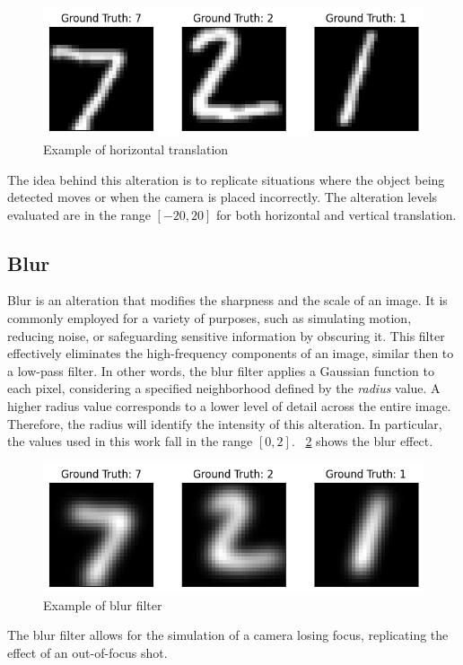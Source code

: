 \begin{figure}[h]
	\centering
	\includegraphics[width=0.6\linewidth]{ImageFiles/Alterations/HT}
	\caption{Example of horizontal translation}
	\label{fig:HT}
\end{figure}

The idea behind this alteration is to replicate situations where the object being detected moves or when the camera is placed incorrectly. The alteration levels evaluated are in the range $[-20,20]$ for both horizontal and vertical translation.

\subsection{Blur}

Blur is an alteration that modifies the sharpness and the scale of an image. It is commonly employed for a variety of purposes, such as simulating motion, reducing noise, or safeguarding sensitive information by obscuring it. This filter effectively eliminates the high-frequency components of an image, similar then to a low-pass filter. In other words, the blur filter applies a Gaussian function to each pixel, considering a specified neighborhood defined by the \textit{radius} value. A higher radius value corresponds to a lower level of detail across the entire image. Therefore, the radius will identify the intensity of this alteration. In particular, the values used in this work fall in the range $[0,2]$. \Fig~\ref{fig:Blur} shows the blur effect.

\begin{figure}[h]
	\centering
	\includegraphics[width=0.6\linewidth]{ImageFiles/Alterations/Blur}
	\caption{Example of blur filter}
	\label{fig:Blur}
\end{figure}

The blur filter allows for the simulation of a camera losing focus, replicating the effect of an out-of-focus shot.

